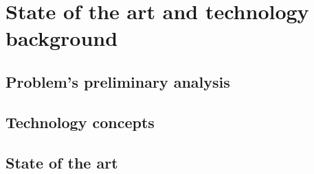 
\chapter{State of the art and technology background}

\section{Problem's preliminary analysis}

\section{Technology concepts}

\section{State of the art}
